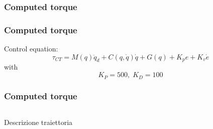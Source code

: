 \subsubsection{Computed torque}
\begin{frame}
\frametitle{Computed torque}
Control equation:
\begin{equation}
	\tau_{CT} = M(q)\ddot{q}_d + C(q,\dot{q})\dot{q} + G(q) + K_pe + K_v\dot{e}
\end{equation}
with
\begin{equation*}
K_P = 500, \; K_D = 100
\end{equation*}
\end{frame}
%
\begin{frame}
\frametitle{Computed torque}
%
\begin{columns}
\begin{column}{0.5\textwidth}
	Descrizione traiettoria
\end{column}
\begin{column}{0.5\textwidth}
	\begin{figure}
	\end{figure}
\end{column}
\end{columns}
\end{frame}
%
